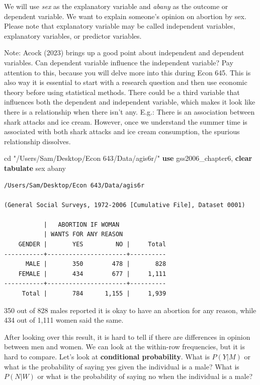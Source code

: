 \documentclass[
]{book}
\newenvironment{Shaded}{\begin{snugshade}}{\end{snugshade}}
\newcommand{\KeywordTok}[1]{\textcolor[rgb]{0.13,0.29,0.53}{\textbf{#1}}}
\newcommand{\NormalTok}[1]{#1}
\newcommand{\StringTok}[1]{\textcolor[rgb]{0.31,0.60,0.02}{#1}}
\begin{document}
We will use \emph{sex} as the explanatory variable and \emph{abany} as the outcome or dependent variable. We want to explain someone's opinion on abortion by sex. Please note that explanatory variable may be called independent variables, explanatory variables, or predictor variables.

Note: Acock (2023) brings up a good point about independent and dependent variables. Can dependent variable influence the independent variable? Pay attention to this, because you will delve more into this during Econ 645. This is also way it is essential to start with a research question and then use economic theory before using statistical methods. There could be a third variable that influences both the dependent and independent variable, which makes it look like there is a relationship when there isn't any. E.g.: There is an association between shark attacks and ice cream. However, once we understand the summer time is associated with both shark attacks and ice cream consumption, the spurious relationship dissolves.

\begin{Shaded}
\begin{Highlighting}[]
\NormalTok{cd }\StringTok{"/Users/Sam/Desktop/Econ 643/Data/agis6r/"}
\KeywordTok{use}\NormalTok{ gss2006\_chapter6, }\KeywordTok{clear}
\KeywordTok{tabulate}\NormalTok{ sex abany}
\end{Highlighting}
\end{Shaded}

\begin{verbatim}
/Users/Sam/Desktop/Econ 643/Data/agis6r

(General Social Surveys, 1972-2006 [Cumulative File], Dataset 0001)

           |   ABORTION IF WOMAN
           | WANTS FOR ANY REASON
    GENDER |       YES         NO |     Total
-----------+----------------------+----------
      MALE |       350        478 |       828 
    FEMALE |       434        677 |     1,111 
-----------+----------------------+----------
     Total |       784      1,155 |     1,939 
\end{verbatim}

350 out of 828 males reported it is okay to have an abortion for any reason, while 434 out of 1,111 women said the same.

After looking over this result, it is hard to tell if there are differences in opinion between men and women. We can look at the within-row frequencies, but it is hard to compare. Let's look at \textbf{conditional probability}. What is \(P(Y|M)\) or what is the probability of saying yes given the individual is a male? What is \(P(N|W)\) or what is the probability of saying no when the individual is a male?
\end{document}
